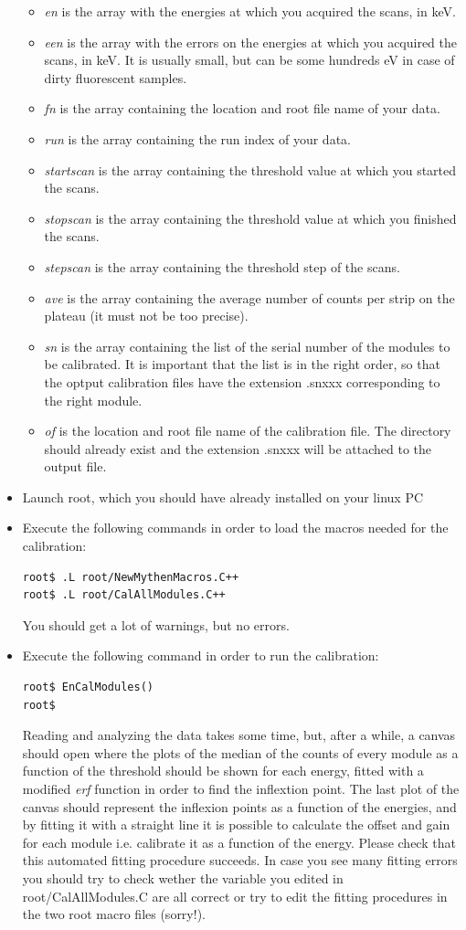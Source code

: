 \begin{itemize}
\begin{itemize}
\item \textit{en} is the array with the energies at which you acquired the scans, in keV.
\item \textit{een} is the array with the errors on the energies at which you acquired the scans, in keV. It is usually small, but can be some hundreds eV in case of dirty fluorescent samples.
\item \textit{fn} is the array containing the location and root file name of your data.
\item \textit{run} is the array containing the run index of your data.
\item \textit{startscan} is the array containing the threshold value at which you started the scans.
\item \textit{stopscan} is the array containing the threshold value at which you finished the scans.
\item \textit{stepscan} is the array containing the threshold step of the scans.
\item \textit{ave} is the array containing the average number of counts per strip on the plateau (it must not be too precise).
\item \textit{sn} is the array containing the list of the serial number of the modules to be calibrated. It is important that the list is in the right order, so that the optput calibration files have the extension .snxxx corresponding to the right module.
\item \textit{of} is the location and root file name of the calibration file. The directory should already exist and the extension .snxxx will be attached to the output file.  
\end{itemize}
\item Launch \textsf{root}, which you should have already installed on your linux PC
\item Execute the following commands in order to load the macros needed for the calibration:
\begin{verbatim}
root$ .L root/NewMythenMacros.C++
root$ .L root/CalAllModules.C++
\end{verbatim}
You should get a lot of warnings, but no errors.
\item Execute the following command in order to run the calibration:
\begin{verbatim}
root$ EnCalModules()
root$
\end{verbatim}
Reading and analyzing the data takes some time, but, after a while, a canvas should open where the plots of the median of the counts of every module as a function of the threshold should be shown for each energy, fitted with a modified \textit{erf} function in order to find the inflextion point. The last plot of the canvas should represent the inflexion points as a function of the energies, and by fitting it with a straight line it is possible to calculate the offset and gain for each module i.e. calibrate it as a function of the energy. Please check that this automated fitting procedure succeeds. In case you see many fitting errors you should try to check wether the variable you edited in  \textsf{root/CalAllModules.C} are all correct or try to edit the fitting procedures in the two root macro files (sorry!).

\end{itemize}
